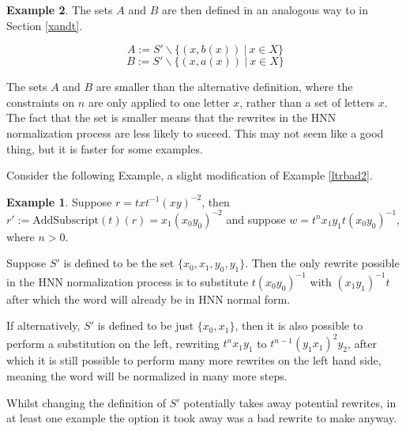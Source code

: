 \documentclass[12pt]{article} %
\theoremstyle{definition}
\theoremstyle{definition}
\theoremstyle{definition}
\theoremstyle{definition}
\theoremstyle{definition}
\theoremstyle{definition}
\newtheorem{exmpl}{Example}[theorem]
\begin{document}
\begin{exmpl}
The sets $A$ and $B$ are then defined in an analogous way to in Section \ref{xandt}.

\begin{equation}
  A := S' \backslash \{(x, b (x)) \ |\  x \in X\}
\end{equation}
\begin{equation}
  B := S' \backslash \{(x, a (x)) \ |\  x \in X\}
\end{equation}

The sets $A$ and $B$ are smaller than the alternative definition, where the constraints
on $n$ are only applied to one letter $x$, rather than a set of letters $x$. The fact
that the set is smaller means that the rewrites in the HNN normalization process
are less likely to suceed. This may not seem like a good thing, but it is faster for
some examples.

Consider the following Example, a slight modification of Example \ref{ltrbad2}.

\begin{exmpl}\label{ltrbad3}
    Suppose $r = txt^{-1}(xy)^{-2}$,
    then \newline $r' := \text{AddSubscript}(t)(r) = {x_1}(x_0y_0)^{-2}$ and
    suppose $w = t^n x_1y_1 t (x_0y_0)^{-1}$, where $n > 0$.

    Suppose $S'$ is defined to be the set $\{x_0, x_1, y_0, y_1\}$.
    Then the only rewrite possible in the HNN normalization
    process is to substitute $t(x_0y_0)^{-1}$ with
    $(x_1y_1)^{-1}t$ after which the word will already be in HNN
    normal form.

    If alternatively, $S'$ is defined to be just $\{x_0, x_1\}$,
    then it is also possible to perform a substitution on the left,
    rewriting $t^nx_1y_1$ to $t^{n-1}(y_1x_1)^2y_2$, after which it
    is still possible to perform many more rewrites on the left hand side,
    meaning the word will be normalized in many more steps.
\end{exmpl}

Whilst changing the definition of $S'$ potentially takes away potential
rewrites, in at least one example the option it took away was a bad
rewrite to make anyway.




\end{exmpl}
\end{document}
